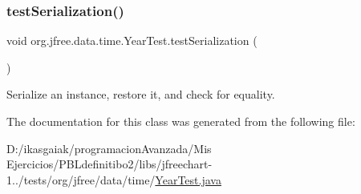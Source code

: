 \subsubsection{\texorpdfstring{test\+Serialization()}{testSerialization()}}
{\footnotesize\ttfamily void org.\+jfree.\+data.\+time.\+Year\+Test.\+test\+Serialization (\begin{DoxyParamCaption}{ }\end{DoxyParamCaption})}

Serialize an instance, restore it, and check for equality. 

The documentation for this class was generated from the following file\+:\begin{DoxyCompactItemize}
\item 
D\+:/ikasgaiak/programacion\+Avanzada/\+Mis Ejercicios/\+P\+B\+Ldefinitibo2/libs/jfreechart-\/1../tests/org/jfree/data/time/\mbox{\hyperlink{_year_test_8java}{Year\+Test.\+java}}\end{DoxyCompactItemize}
